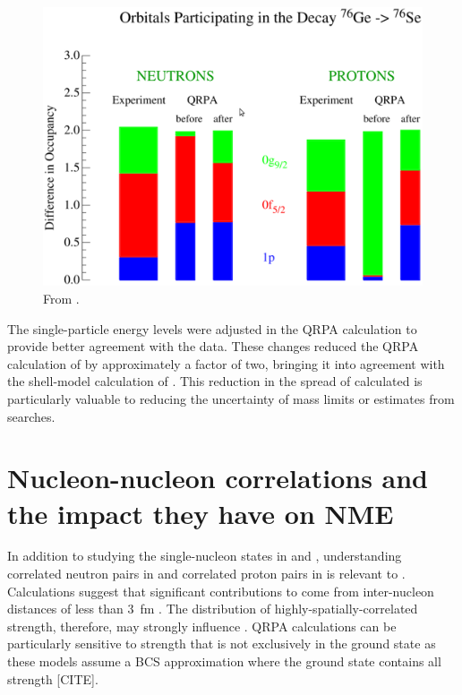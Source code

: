 \begin{figure}[htp]
\centering
\includegraphics[width=1.0\textwidth]{figures/occupancyDiffs.eps}
\caption{From \cite{schiffer_review}.}
\label{fig:occupancyDiffs}
\end{figure}
The single-particle energy levels were adjusted in the QRPA calculation \cite{SuhonenEnergyAdjust} to provide better agreement with the data.  These changes reduced the QRPA calculation of \NME by approximately a factor of two, bringing it into agreement with the shell-model calculation of \NME.  This reduction in the spread of calculated \NME is particularly valuable to reducing the uncertainty of mass limits or estimates from \zvbb searches. 

\section{Nucleon-nucleon correlations and the impact they have on NME}

In addition to studying the single-nucleon states in \GeTargets and \SeProducts, understanding correlated neutron pairs in  and correlated proton pairs in  is relevant to \NME.  Calculations suggest that significant contributions to \NME come from inter-nucleon distances of less than 3~fm \cite{anatomy}.  The distribution of highly-spatially-correlated \zp strength, therefore, may strongly influence \NME.  QRPA calculations can be particularly sensitive to \zp strength that is not exclusively in the ground state as these models assume a BCS approximation where the ground state contains all \zp strength [CITE]. 

